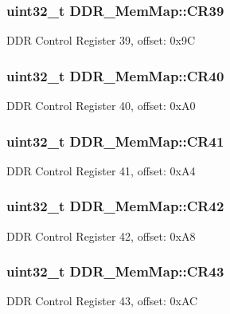 \subsubsection[{C\+R39}]{\setlength{\rightskip}{0pt plus 5cm}uint32\+\_\+t D\+D\+R\+\_\+\+Mem\+Map\+::\+C\+R39}\label{struct_d_d_r___mem_map_aebfebf464f9aa9fb6f7e67f96a972eb8}
D\+D\+R Control Register 39, offset\+: 0x9\+C \hypertarget{struct_d_d_r___mem_map_a126961b83855f3145588def5bdcbaa86}{}
\subsubsection[{C\+R40}]{\setlength{\rightskip}{0pt plus 5cm}uint32\+\_\+t D\+D\+R\+\_\+\+Mem\+Map\+::\+C\+R40}\label{struct_d_d_r___mem_map_a126961b83855f3145588def5bdcbaa86}
D\+D\+R Control Register 40, offset\+: 0x\+A0 \hypertarget{struct_d_d_r___mem_map_ad2ab5215879d349cf5de04bf268e23c1}{}
\subsubsection[{C\+R41}]{\setlength{\rightskip}{0pt plus 5cm}uint32\+\_\+t D\+D\+R\+\_\+\+Mem\+Map\+::\+C\+R41}\label{struct_d_d_r___mem_map_ad2ab5215879d349cf5de04bf268e23c1}
D\+D\+R Control Register 41, offset\+: 0x\+A4 \hypertarget{struct_d_d_r___mem_map_aa23fd050dee7ce901dde46bd0cefa1d6}{}
\subsubsection[{C\+R42}]{\setlength{\rightskip}{0pt plus 5cm}uint32\+\_\+t D\+D\+R\+\_\+\+Mem\+Map\+::\+C\+R42}\label{struct_d_d_r___mem_map_aa23fd050dee7ce901dde46bd0cefa1d6}
D\+D\+R Control Register 42, offset\+: 0x\+A8 \hypertarget{struct_d_d_r___mem_map_a4b8d9d2bc1b3f7805c06e0f0b88df9d7}{}
\subsubsection[{C\+R43}]{\setlength{\rightskip}{0pt plus 5cm}uint32\+\_\+t D\+D\+R\+\_\+\+Mem\+Map\+::\+C\+R43}\label{struct_d_d_r___mem_map_a4b8d9d2bc1b3f7805c06e0f0b88df9d7}
D\+D\+R Control Register 43, offset\+: 0x\+A\+C \hypertarget{struct_d_d_r___mem_map_a7147d871f78c6c242c79ca0e102c51b9}{}
